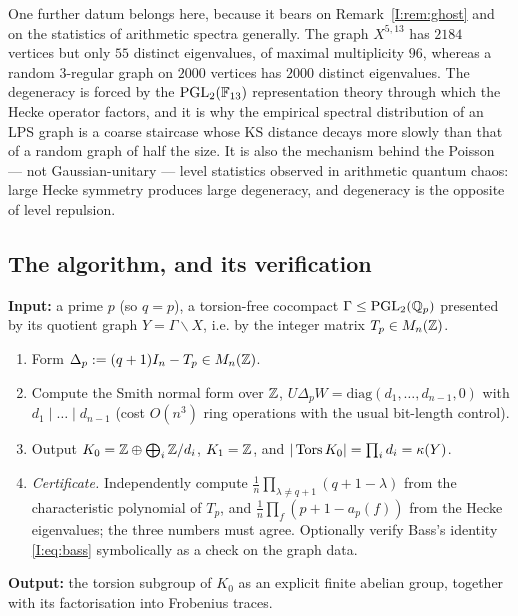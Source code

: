 \begin{remark}
One further datum belongs here, because it bears on Remark~\ref{I:rem:ghost} and on the
statistics of arithmetic spectra generally. The graph $X^{5,13}$ has $2184$ vertices but
only $55$ distinct eigenvalues, of maximal multiplicity $96$, whereas a random
$3$-regular graph on $2000$ vertices has $2000$ distinct eigenvalues. The degeneracy is
forced by the $\mathrm{PGL}_2(\mathbb{F}_{13})$ representation theory through which the Hecke
operator factors, and it is why the empirical spectral distribution of an LPS graph is a
coarse staircase whose $\mathrm{KS}$ distance decays more slowly than that of a random
graph of half the size. It is also the mechanism behind the Poisson --- not
Gaussian-unitary --- level statistics observed in arithmetic quantum chaos: large Hecke
symmetry produces large degeneracy, and degeneracy is the opposite of level repulsion.
\end{remark}

\subsection{The algorithm, and its verification}

\begin{algorithm}\label{I:alg:main}
\textbf{Input:} a prime $p$ (so $q=p$), a torsion-free cocompact $\Gamma\le\mathrm{PGL}_2(\mathbb{Q}_p)$
presented by its quotient graph $Y=\Gamma\backslash X$, i.e. by the integer matrix
$T_p\in M_n(\mathbb{Z})$.
\begin{enumerate}
\item[(1)] Form $\Delta_p:=(q+1)I_n-T_p\in M_n(\mathbb{Z})$.
\item[(2)] Compute the Smith normal form over $\mathbb{Z}$,
$U\Delta_pW=\mathrm{diag}(d_1,\dots,d_{n-1},0)$ with $d_1\mid\dots\mid d_{n-1}$
(cost $O(n^3)$ ring operations with the usual bit-length control).
\item[(3)] Output $K_0=\mathbb{Z}\oplus\bigoplus_i\mathbb{Z}/d_i$, $K_1=\mathbb{Z}$, and
$|\operatorname{Tors} K_0|=\prod_id_i=\kappa(Y)$.
\item[(4)] \emph{Certificate.} Independently compute
$\frac1n\prod_{\lambda\neq q+1}(q+1-\lambda)$ from the characteristic polynomial of
$T_p$, and $\frac1n\prod_f(p+1-a_p(f))$ from the Hecke eigenvalues; the three numbers
must agree. Optionally verify Bass's identity \eqref{I:eq:bass} symbolically as a check on
the graph data.
\end{enumerate}
\textbf{Output:} the torsion subgroup of $K_0$ as an explicit finite abelian group,
together with its factorisation into Frobenius traces.
\end{algorithm}

